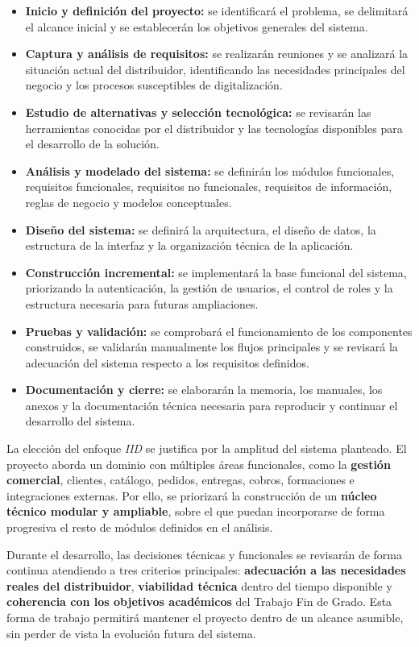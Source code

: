 \begin{itemize}
    \item \textbf{Inicio y definición del proyecto:} se identificará el problema, se delimitará el alcance inicial y se establecerán los objetivos generales del sistema.
    \item \textbf{Captura y análisis de requisitos:} se realizarán reuniones y se analizará la situación actual del distribuidor, identificando las necesidades principales del negocio y los procesos susceptibles de digitalización.
    \item \textbf{Estudio de alternativas y selección tecnológica:} se revisarán las herramientas conocidas por el distribuidor y las tecnologías disponibles para el desarrollo de la solución.
    \item \textbf{Análisis y modelado del sistema:} se definirán los módulos funcionales, requisitos funcionales, requisitos no funcionales, requisitos de información, reglas de negocio y modelos conceptuales.
    \item \textbf{Diseño del sistema:} se definirá la arquitectura, el diseño de datos, la estructura de la interfaz y la organización técnica de la aplicación.
    \item \textbf{Construcción incremental:} se implementará la base funcional del sistema, priorizando la autenticación, la gestión de usuarios, el control de roles y la estructura necesaria para futuras ampliaciones.
    \item \textbf{Pruebas y validación:} se comprobará el funcionamiento de los componentes construidos, se validarán manualmente los flujos principales y se revisará la adecuación del sistema respecto a los requisitos definidos.
    \item \textbf{Documentación y cierre:} se elaborarán la memoria, los manuales, los anexos y la documentación técnica necesaria para reproducir y continuar el desarrollo del sistema.
\end{itemize}

La elección del enfoque \textit{IID} se justifica por la amplitud del sistema planteado. El proyecto aborda un dominio con múltiples áreas funcionales, como la \textbf{gestión comercial}, clientes, catálogo, pedidos, entregas, cobros, formaciones e integraciones externas. Por ello, se priorizará la construcción de un \textbf{núcleo técnico modular y ampliable}, sobre el que puedan incorporarse de forma progresiva el resto de módulos definidos en el análisis.

Durante el desarrollo, las decisiones técnicas y funcionales se revisarán de forma continua atendiendo a tres criterios principales: \textbf{adecuación a las necesidades reales del distribuidor}, \textbf{viabilidad técnica} dentro del tiempo disponible y \textbf{coherencia con los objetivos académicos} del Trabajo Fin de Grado. Esta forma de trabajo permitirá mantener el proyecto dentro de un alcance asumible, sin perder de vista la evolución futura del sistema.

